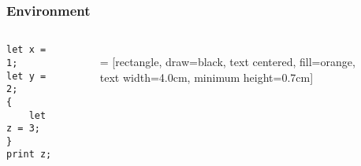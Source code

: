 \documentclass{beamer}
\begin{document}
    \begin{frame}[fragile]
    \frametitle{Environment}
    \begin{columns}
    \begin{lstlisting}[]
let x = 1;
let y = 2;
{
    let z = 3;
}
print z;
    \end{lstlisting}
    \begin{figure}
     = [rectangle, draw=black, text centered, fill=orange, text width=4.0cm, minimum height=0.7cm]
    \end{figure}
    \end{columns}
    \end{frame}
    
\end{document}
